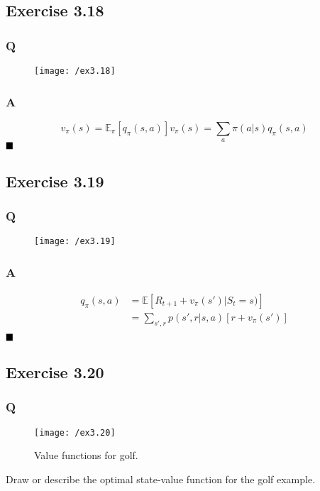 \subsection{Exercise 3.18}
\subsubsection*{Q}
\begin{figure}[h!]
	\centering
	\texttt{[image: /ex3.18]}
	\label{fig:3.18}
\end{figure}

\subsubsection*{A}
\begin{equation}
v_\pi(s) = \mathbb{E}_\pi \left[q_\pi(s,a)\right] 
v_\pi(s) = \sum_{a} \pi(a|s) q_\pi(s,a)
\end{equation}
$
\hfill \blacksquare
$

\subsection{Exercise 3.19}
\subsubsection*{Q}
\begin{figure}[h!]
	\centering
	\texttt{[image: /ex3.19]}
	\label{fig:3.19}
\end{figure}

\subsubsection*{A}
\begin{align}
q_\pi(s, a) &= \mathbb{E} \left[R_{t+1} + v_\pi(s') | S_{t} = s)\right] \\
&= \sum_{s', r} p(s', r | s, a) [r +v_\pi(s')] \\
\end{align}
$
\hfill \blacksquare
$

\subsection{Exercise 3.20}
\subsubsection*{Q}
\begin{figure}[h!]
	\centering
	\texttt{[image: /ex3.20]}
	\caption{Value functions for golf.}
	\label{fig:3.20}
\end{figure}
Draw or describe the optimal state-value function for the golf example.


